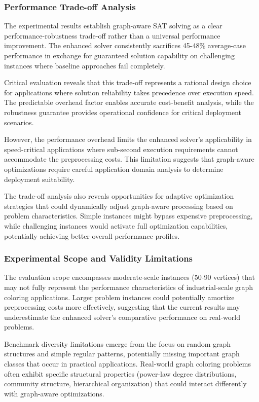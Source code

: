 \subsubsection{Performance Trade-off Analysis}

The experimental results establish graph-aware SAT solving as a clear performance-robustness trade-off rather than a universal performance improvement. The enhanced solver consistently sacrifices 45-48\% average-case performance in exchange for guaranteed solution capability on challenging instances where baseline approaches fail completely.

Critical evaluation reveals that this trade-off represents a rational design choice for applications where solution reliability takes precedence over execution speed. The predictable overhead factor enables accurate cost-benefit analysis, while the robustness guarantee provides operational confidence for critical deployment scenarios.

However, the performance overhead limits the enhanced solver's applicability in speed-critical applications where sub-second execution requirements cannot accommodate the preprocessing costs. This limitation suggests that graph-aware optimizations require careful application domain analysis to determine deployment suitability.

The trade-off analysis also reveals opportunities for adaptive optimization strategies that could dynamically adjust graph-aware processing based on problem characteristics. Simple instances might bypass expensive preprocessing, while challenging instances would activate full optimization capabilities, potentially achieving better overall performance profiles.

\subsubsection{Experimental Scope and Validity Limitations}

The evaluation scope encompasses moderate-scale instances (50-90 vertices) that may not fully represent the performance characteristics of industrial-scale graph coloring applications. Larger problem instances could potentially amortize preprocessing costs more effectively, suggesting that the current results may underestimate the enhanced solver's comparative performance on real-world problems.

Benchmark diversity limitations emerge from the focus on random graph structures and simple regular patterns, potentially missing important graph classes that occur in practical applications. Real-world graph coloring problems often exhibit specific structural properties (power-law degree distributions, community structure, hierarchical organization) that could interact differently with graph-aware optimizations.

